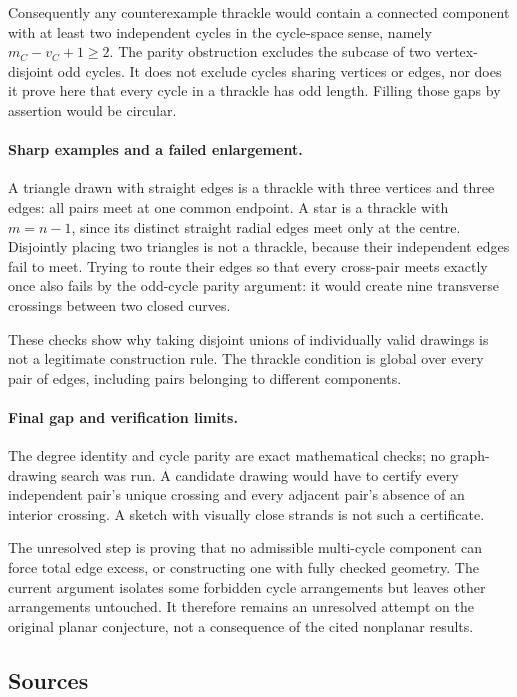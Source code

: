 \documentclass[11pt,a4paper]{article}
\begin{document}
Consequently any counterexample thrackle would contain a connected component with at least two independent cycles in the cycle-space sense, namely $m_C-v_C+1\ge2$. The parity obstruction excludes the subcase of two vertex-disjoint odd cycles. It does not exclude cycles sharing vertices or edges, nor does it prove here that every cycle in a thrackle has odd length. Filling those gaps by assertion would be circular.

\paragraph{Sharp examples and a failed enlargement.}
A triangle drawn with straight edges is a thrackle with three vertices and three edges: all pairs meet at one common endpoint. A star is a thrackle with $m=n-1$, since its distinct straight radial edges meet only at the centre. Disjointly placing two triangles is not a thrackle, because their independent edges fail to meet. Trying to route their edges so that every cross-pair meets exactly once also fails by the odd-cycle parity argument: it would create nine transverse crossings between two closed curves.

These checks show why taking disjoint unions of individually valid drawings is not a legitimate construction rule. The thrackle condition is global over every pair of edges, including pairs belonging to different components.

\paragraph{Final gap and verification limits.}
The degree identity and cycle parity are exact mathematical checks; no graph-drawing search was run. A candidate drawing would have to certify every independent pair's unique crossing and every adjacent pair's absence of an interior crossing. A sketch with visually close strands is not such a certificate.

The unresolved step is proving that no admissible multi-cycle component can force total edge excess, or constructing one with fully checked geometry. The current argument isolates some forbidden cycle arrangements but leaves other arrangements untouched. It therefore remains an unresolved attempt on the original planar conjecture, not a consequence of the cited nonplanar results.

\subsection{Sources}
\end{document}
